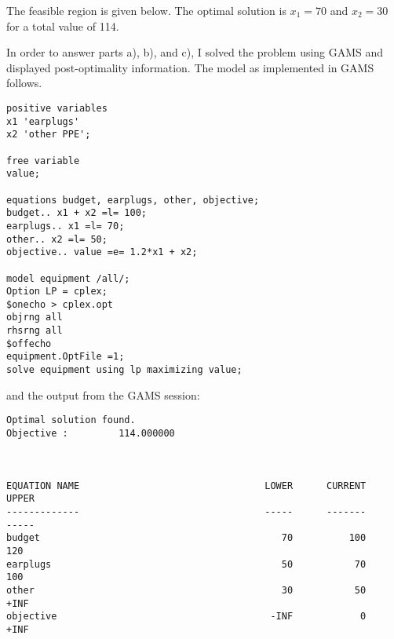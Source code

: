 \begin{enumerate}
\begin{solution}
The feasible region is given below. The optimal solution is $x_1=70$ and $x_2=30$
for a total value of 114.
\begin{center}
\end{center}

In order to answer parts a), b), and c), I solved the problem using GAMS
and displayed post-optimality information. The model as implemented in GAMS follows.
\begin{Verbatim}[samepage=true]
positive variables
x1 'earplugs'
x2 'other PPE';

free variable
value;

equations budget, earplugs, other, objective;
budget.. x1 + x2 =l= 100;
earplugs.. x1 =l= 70;
other.. x2 =l= 50;
objective.. value =e= 1.2*x1 + x2;

model equipment /all/;
Option LP = cplex;
$onecho > cplex.opt
objrng all
rhsrng all
$offecho
equipment.OptFile =1;
solve equipment using lp maximizing value;
\end{Verbatim}
and the output from the GAMS session:
\begin{Verbatim}[samepage=true]
Optimal solution found.
Objective :         114.000000

  
 
EQUATION NAME                                 LOWER      CURRENT        UPPER
-------------                                 -----      -------        -----
budget                                           70          100          120
earplugs                                         50           70          100
other                                            30           50         +INF
objective                                      -INF            0         +INF
  

\end{Verbatim}
\end{solution}
\end{enumerate}

